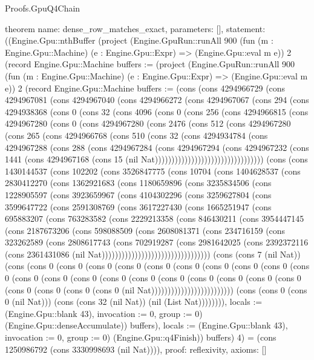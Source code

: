 \begin{lexlean}{Proofs.GpuQ4Chain}
\begin{semanticmodule}
theorem{
  name: dense_row_matches_exact,
  parameters: [],
  statement: ((Engine.Gpu::nthBuffer (project (Engine.GpuRun::runAll 900 (fun (m : Engine.Gpu::Machine) (e : Engine.Gpu::Expr) => (Engine.Gpu::eval m e)) 2 (record Engine.Gpu::Machine {buffers := (project (Engine.GpuRun::runAll 900 (fun (m : Engine.Gpu::Machine) (e : Engine.Gpu::Expr) => (Engine.Gpu::eval m e)) 2 (record Engine.Gpu::Machine {buffers := (cons (cons 4294966729 (cons 4294967081 (cons 4294967040 (cons 4294966272 (cons 4294967067 (cons 294 (cons 4294938368 (cons 0 (cons 32 (cons 4096 (cons 0 (cons 256 (cons 4294966815 (cons 4294967280 (cons 0 (cons 4294967280 (cons 2476 (cons 512 (cons 4294967280 (cons 265 (cons 4294966768 (cons 510 (cons 32 (cons 4294934784 (cons 4294967288 (cons 288 (cons 4294967284 (cons 4294967294 (cons 4294967232 (cons 1441 (cons 4294967168 (cons 15 (nil Nat))))))))))))))))))))))))))))))))) (cons (cons 1430144537 (cons 102202 (cons 3526847775 (cons 10704 (cons 1404628537 (cons 2830412270 (cons 1362921683 (cons 1180659896 (cons 3235834506 (cons 1228905597 (cons 3923659967 (cons 4104302296 (cons 3259627804 (cons 3599647722 (cons 2591308769 (cons 3617227430 (cons 1665251947 (cons 695883207 (cons 763283582 (cons 2229213358 (cons 846430211 (cons 3954447145 (cons 2187673206 (cons 598088509 (cons 2608081371 (cons 234716159 (cons 323262589 (cons 2808617743 (cons 702919287 (cons 2981642025 (cons 2392372116 (cons 2361431086 (nil Nat))))))))))))))))))))))))))))))))) (cons (cons 7 (nil Nat)) (cons (cons 0 (cons 0 (cons 0 (cons 0 (cons 0 (cons 0 (cons 0 (cons 0 (cons 0 (cons 0 (cons 0 (cons 0 (cons 0 (cons 0 (cons 0 (cons 0 (cons 0 (cons 0 (cons 0 (cons 0 (cons 0 (cons 0 (cons 0 (cons 0 (nil Nat))))))))))))))))))))))))) (cons (cons 0 (cons 0 (nil Nat))) (cons (cons 32 (nil Nat)) (nil (List Nat)))))))), locals := (Engine.Gpu::blank 43), invocation := 0, group := 0}) (Engine.Gpu::denseAccumulate)) buffers), locals := (Engine.Gpu::blank 43), invocation := 0, group := 0}) (Engine.Gpu::q4Finish)) buffers) 4) = (cons 1250986792 (cons 3330998693 (nil Nat)))),
  proof: reflexivity{},
  axioms: []
}
\end{semanticmodule}
\end{lexlean}
